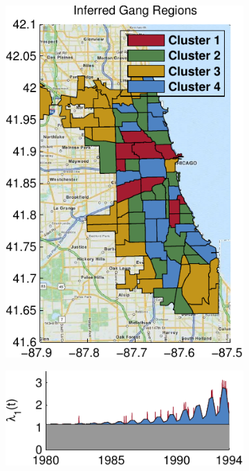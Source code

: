 \begin{figure}[!t]
\begin{center}
\begin{subfigure}[B]{.32\textwidth}
\includegraphics[width=\linewidth]{figures/ch2/icpsr_map} 
\caption{}
\label{fig:chicago_map}
\end{subfigure}
\begin{subfigure}[B]{.28\textwidth}
\includegraphics[width=\linewidth]{figures/ch2/icpsr_rate1} \\

\end{subfigure}
\end{center}
\end{figure}
